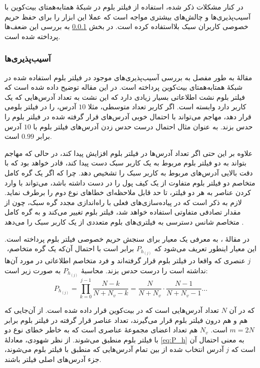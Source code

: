 در کنار مشکلات ذکر شده، استفاده از فیلتر بلوم در شبکهٔ همتا‌به‌همتای بیت‌کوین با آسیب‌پذیری‌ها و چالش‌های بیشتری مواجه است که عملا این ابزار را برای حفظ حریم خصوصی کاربران سبک بلااستفاده کرده است. در بخش \ref{Vulnerabilities} به بررسی این ضعف‌ها پرداخته شده است.

\subsubsection{آسیب‌‌پذیری‌ها }
\label{Vulnerabilities}
مقالهٔ \cite{Gervais2014} به طور مفصل به بررسی آسیب‌پذیری‌های موجود در فیلتر بلوم استفاده شده در شبکهٔ همتا‌به‌همتای بیت‌کوین پرداخته است. در این مقاله توضیح داده شده است که فیلتر بلوم نشت اطلاعاتی بسیار زیادی دارد که این نشت به تعداد آدرس‌هایی که یک کاربر دارد وابسته است. اگر کاربر تعداد متوسطی، مثلا $10$ آدرس، را در فیلتر بلومی قرار دهد، مهاجم می‌تواند با احتمال خوبی آدرس‌های قرار گرفته شده در فیلتر بلوم را حدس بزند. به عنوان مثال احتمال درست حدس زدن آدرس‌های فیلتر بلوم با $10$ آدرس برابر $0.99$ است.  

علاوه بر این حتی اگر تعداد آدرس‌ها در فیلتر‌ بلوم افزایش پیدا کند، در حالی که مهاجم بتواند به دو فیلتر بلوم مربوط به یک کاربر سبک دست پیدا کند، قادر خواهد بود که با دقت بالایی آدرس‌های مربوط به کاربر سبک را تشخیص دهد. چرا که اگر یک گره کامل متخاصم دو فیلتر بلوم متفاوت از یک کیف پول را در دست داشته باشد، می‌تواند با وارد کردن عناصر به هر دو فیلتر، تا حد قابل ملاحظه‌ای خطاهای نوع دوم را برطرف نماید\cite{Nick2015}. لازم به ذکر است که در پیاده‌سازی‌های فعلی با راه‌اندازی مجدد گره سبک، چون از مقدار تصادفی  متفاوتی استفاده خواهد شد، فیلتر بلوم تغییر می‌کند و به گره کامل متخاصم شانس دسترسی به فیلتری‌های بلوم متعددی از یک کاربر سبک را می‌دهد\cite{Gervais2014} .

در مقالهٔ \cite{Gervais2014}، به معرفی یک معیار برای سنجش حریم خصوصی  فیلتر بلوم پرداخته است. این معیار اینطور تعریف می‌شود که 
$P_{h_{(j)}}$
 برابر است با احتمال آن‌که یک گره متخاصم، ‌$j$ عنصری که واقعا در فیلتر بلوم قرار گرفته‌اند و فرد متخاصم اطلاعاتی در مورد آن‌ها نداشته است را درست حدس بزند. محاسبهٔ $P_{h_{(j)}}$ به صورت زیر است:
 \begin{equation}
 \label{eq:P_h}
 P_{h_{(j)}} = \prod_{k=0}^{j-1}\frac{N-k}{N+N_v-k} = \frac{N}{N+N_v}\cdot\frac{N-1}{N+N_v-1} \ldots
 \end{equation}
  
  که در آن $N$ تعداد آدرس‌هایی است که در بیت‌کوین قرار داده شده است. از آن‌جایی که هم  و هم  درون فیلتر بلوم قرار می‌گیرند، تعداد عناصر قرار گرفته در فیلتر بلوم برابر $m=2N$ است. $N_v$ هم تعداد اعضای مجموعه‌ٔ عناصری است که به خاطر خطای نوع دو با فیلتر بلوم منطبق می‌شوند. از نظر شهودی، معادلهٔ \eqref{eq:P_h} به معنی احتمال آن است که $j$ آدرس انتخاب شده از بین تمام آدرس‌هایی که منطبق با فیلتر بلوم می‌شوند، جزء آدرس‌های اصلی فیلتر باشند.
  
